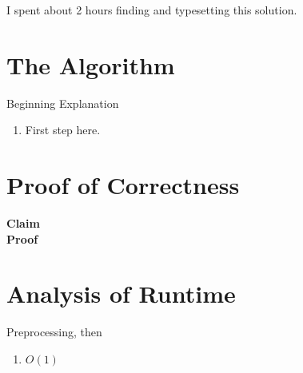 \documentclass{article}
\newcommand{\claim}{\textbf{Claim} \hfill \\}
\renewcommand{\proof}{\textbf{Proof} \hfill \\}
\theoremstyle{definition}
\theoremstyle{remark}
\begin{document}
  	I spent about 2 hours finding and typesetting this solution. 
	\section{The Algorithm}
	Beginning Explanation	
		\begin{enumerate}
 			\item First step here.
		\end{enumerate}
	\section{Proof of Correctness}
		\claim
		\proof
		
		
		
	\section{Analysis of Runtime}
		Preprocessing, then
		\begin{enumerate}
			\item $O(1)$ 
		\end{enumerate}
    
\end{document}

